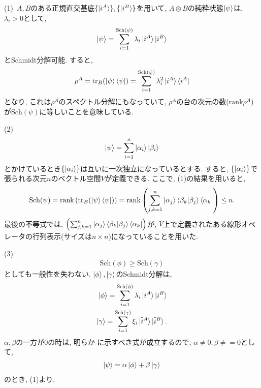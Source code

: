 \begin{problem}
\label{problem2.2}
(1)\
$A,B$のある正規直交基底$\{\ket{i^A}\},\{ \ket{i^B} \}$を用いて, $A \otimes B$の純粋状態$\ket{\psi}$は, $\lambda_i > 0$として,
\begin{align*}
    \ket{\psi} = \sum_{i=1}^{\mathrm{Sch}(\psi)} \lambda_i \ket{i^A} \ket{i^B}
\end{align*}
とSchmidt分解可能. すると,
\begin{align*}
    \rho^A = \mathrm{tr}_B(\ket{\psi} \bra{\psi}) = \sum_{i=1}^{\mathrm{Sch}(\psi)} \lambda_i^2 \ket{i^A} \bra{i^A}
\end{align*}
となり, これは$\rho^A$のスペクトル分解にもなっていて, $\rho^A$の台の次元の数($\mathrm{rank}\rho^A$)が$\mathrm{Sch}(\psi)$に等しいことを意味している.
\par
(2)\
\begin{align*}
    \ket{\psi} = \sum_{i = 1}^{n} \ket{\alpha_i}\ket{\beta_i}
\end{align*}
とかけているとき$\{ \ket{\alpha_i} \}$は互いに一次独立になっているとする. すると, $\{ \ket{\alpha_i} \}$で張られる次元$n$のベクトル空間$V$が定義できる. ここで, (1)の結果を用いると,
\begin{align*}
    \mathrm{Sch}(\psi)
    =  \mathrm{rank} \left( \mathrm{tr}_B(\ket{\psi} \bra{\psi}) \right)
    =  \mathrm{rank} \left( \sum_{j,k = 1}^{n} \ket{\alpha_j}\braket{\beta_k|\beta_j} \bra{\alpha_k}\right)
    \leq n.
\end{align*}
最後の不等式では, $\left( \sum_{j,k = 1}^{n} \ket{\alpha_j}\braket{\beta_k|\beta_j} \bra{\alpha_k}\right)$が, $V$上で定義されたある線形オペレータの行列表示(サイズは$n\times n$)になっていることを用いた.
\par
(3)\
\begin{align*}
    \mathrm{Sch}(\phi) \geq \mathrm{Sch}(\gamma)
\end{align*}
としても一般性を失わない.
$\ket{\phi}, \ket{\gamma}$のSchmidt分解は,
\begin{align*}
    \ket{\phi} = \sum_{i=1}^{\mathrm{Sch}(\phi)} \lambda_i \ket{i^A} \ket{i^B} \\
    \ket{\gamma} = \sum_{i=1}^{\mathrm{Sch}(\gamma)} \xi_i \ket{\tilde{i}^A} \ket{\tilde{i}^B} .
\end{align*}
$\alpha, \beta$の一方が0の時は, 明らか
に示すべき式が成立するので,
$\alpha \neq 0, \beta \neq = 0$として,
\begin{align*}
    \ket{\psi} = \alpha \ket{\phi} + \beta \ket{\gamma}
\end{align*}
のとき,
(1)より,
\begin{align*}

\end{align*}
\end{problem}
